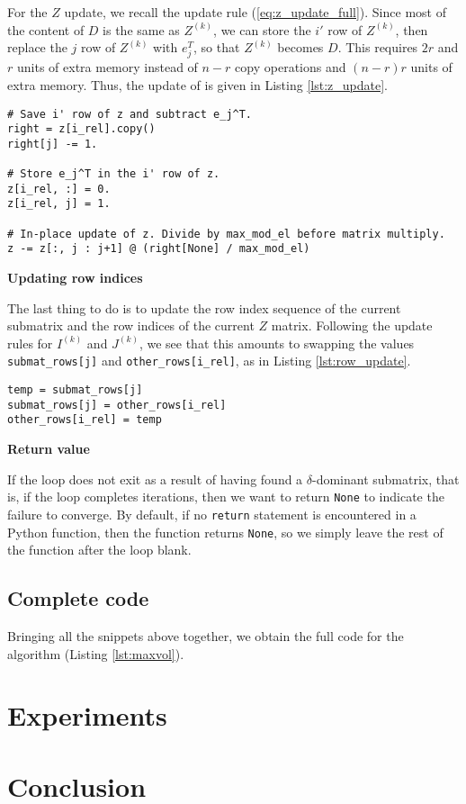 \documentclass{article}
\begin{document}
	For the $Z$ update, we recall the update rule (\ref{eq:z_update_full}). Since most of the content of $D$ is the same as $Z^{(k)}$, we can store the $i'$ row of $Z^{(k)}$, then replace the $j$ row of $Z^{(k)}$ with $e_j^T$, so that $Z^{(k)}$ becomes $D$. This requires $2r$ and $r$ units of extra memory instead of $n-r$ copy operations and $(n-r)r$ units of extra memory. Thus, the update of \vz{} is given in Listing \ref{lst:z_update}.
	\begin{lstlisting}[caption={$Z$ update}, label=lst:z_update]
# Save i' row of z and subtract e_j^T.
right = z[i_rel].copy()
right[j] -= 1.

# Store e_j^T in the i' row of z.
z[i_rel, :] = 0.
z[i_rel, j] = 1.

# In-place update of z. Divide by max_mod_el before matrix multiply.
z -= z[:, j : j+1] @ (right[None] / max_mod_el)
	\end{lstlisting}
	
	\textbf{Updating row indices}
	
	The last thing to do is to update the row index sequence of the current submatrix and the row indices of the current $Z$ matrix. Following the update rules for $I^{(k)}$ and $J^{(k)}$, we see that this amounts to swapping the values \texttt{submat\_rows[j]} and \texttt{other\_rows[i\_rel]}, as in Listing \ref{lst:row_update}.
	\begin{lstlisting}[caption={row index update}, label=lst:row_update]
temp = submat_rows[j]
submat_rows[j] = other_rows[i_rel]
other_rows[i_rel] = temp
	\end{lstlisting}
	
	\textbf{Return value}
	
	If the loop does not exit as a result of having found a $\delta$-dominant submatrix, that is, if the loop completes \vmaxiter{} iterations, then we want to return \texttt{None} to indicate the failure to converge. By default, if no \texttt{return} statement is encountered in a Python function, then the function returns \texttt{None}, so we simply leave the rest of the function after the loop blank.
	
	\subsection{Complete code}
	Bringing all the snippets above together, we obtain the full code for the \maxvol{} algorithm (Listing \ref{lst:maxvol}).
	
	
	\section{Experiments}
	
	\section{Conclusion}
	
	
	
\end{document}
